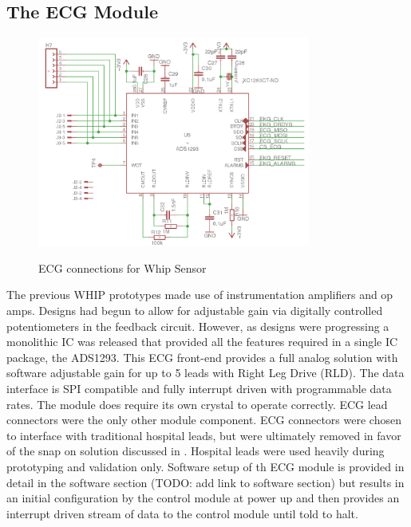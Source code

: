\subsection{The ECG Module}
\begin{figure}
	\begin{center}
		\label{fig:Rev5_ECG}
		\includegraphics[scale=1,width=0.8\textwidth]{Images/Rev5_ECG.png} 
		\caption{ECG connections for Whip Sensor}
	\end{center}
\end{figure}

The previous WHIP prototypes made use of instrumentation amplifiers and op amps. Designs had begun to allow for adjustable gain via digitally controlled potentiometers in the feedback circuit. However, as designs were progressing a monolithic IC was released that provided all the features required in a single IC package, the ADS1293. This ECG front-end provides a full analog solution with software adjustable gain for up to 5 leads with Right Leg Drive (RLD). The data interface is SPI compatible and fully interrupt driven with programmable data rates. The module does require its own crystal to operate correctly. ECG lead connectors were the only other module component. ECG connectors were chosen to interface with traditional hospital leads, but were ultimately removed in favor of the snap on solution discussed in . Hospital leads were used heavily during prototyping and validation only. Software setup of th ECG module is provided in detail in the software section (TODO: add link to software section) but results in an initial configuration by the control module at power up and then provides an interrupt driven stream of data to the control module until told to halt.

